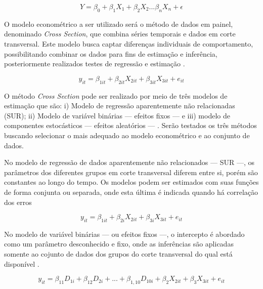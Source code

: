 \documentclass[
  12pt,
  12pt,
  openright,
  oneside,
  a4paper,
  chapter=TITLE,
  section=TITLE,
  subsection=TITLE,
  subsubsection=TITLE,
  english,
  portugues,
  sumario=tradicional]{abntex2}
\begin{document}
\begin{equation}
Y = \beta_0 + \beta_1X_1 + \beta_2X_2...\beta_nX_n + \epsilon
\end{equation}

O modelo econométrico a ser utilizado será o método de dados em painel, denominado \emph{Cross Section}, que combina séries temporais e dados em corte transversal. Este modelo busca captar diferenças individuais de comportamento, possibilitando combinar os dados para fins de estimação e inferência, posteriormente realizados testes de regressão e estimação \cite{hill:2010}.

\begin{equation}
y_{it} = \beta_{1it} + \beta_{2it}X_{2it} + \beta_{3it}X_{3it} + e_{it}
\end{equation}

O método \emph{Cross Section} pode ser realizado por meio de três modelos de estimação que são: i) Modelo de regressão aparentemente não relacionadas (SUR); ii) Modelo de variável binárias --- efeitos fixos --- e iii) modelo de componentes estocásticos --- efeitos aleatórios --- \cite{hill:2010}. Serão testados os três métodos buscando selecionar o mais adequado ao modelo econométrico e ao conjunto de dados.

No modelo de regressão de dados aparentemente não relacionados --- SUR ---, os parâmetros dos diferentes grupos em corte transversal diferem entre si, porém são constantes ao longo do tempo. Os modelos podem ser estimados com suas funções de forma conjunta ou separada, onde esta última é indicada quando há correlação dos erros \cite{hill:2010}

\begin{equation}
y_{it} = \beta_{1it} + \beta_{2i}X_{2it} + \beta_{3i}X_{3it} + e_{it}
\end{equation}

\vspace{20pt}

No modelo de variável binárias --- ou efeitos fixos ---, o intercepto é abordado como um parâmetro desconhecido e fixo, onde as inferências são aplicadas somente ao cojunto de dados dos grupos do corte transversal do qual está disponível \cite{hill:2010}.

\begin{equation}
y_{it} = \beta_{11}D_{1i} + \beta_{12}D_{2i} + ... + \beta_{1,10}D_{10i} + \beta_{2}X_{2it} + \beta_{3}X_{3it} + e_{it}
\end{equation}

\vspace{20pt}
\end{document}
